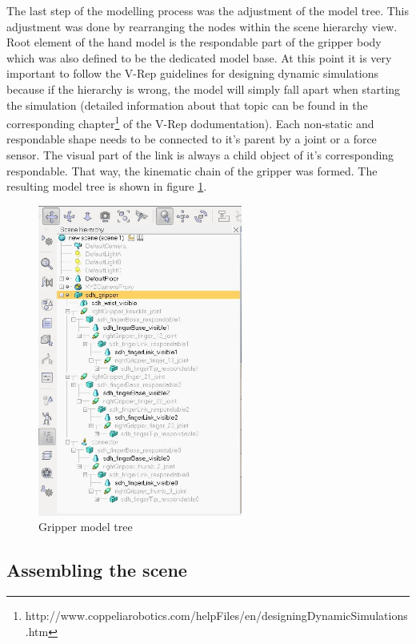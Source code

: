 The last step of the modelling process was the adjustment of the model tree. This adjustment was done by rearranging the nodes within the scene hierarchy view. Root element of the hand model is the respondable part of the gripper body which was also defined to be the dedicated model base. At this point it is very important to follow the V-Rep guidelines for designing dynamic simulations because if the hierarchy is wrong, the model will simply fall apart when starting the simulation (detailed information about that topic can be found in the corresponding chapter\footnote{http://www.coppeliarobotics.com/helpFiles/en/designingDynamicSimulations.htm} of the V-Rep dodumentation). Each non-static and respondable shape needs to be connected to it's parent by a joint or a force sensor. The visual part of the link is always a child object of it's corresponding respondable. That way, the kinematic chain of the gripper was formed. The resulting model tree is shown in figure \ref{fig:gripper_tree}.
\begin{figure}[ht]
	\centering
  	\includegraphics[width=0.6\textwidth]{images/gripper_tree.jpg}
	\caption{Gripper model tree}
	\label{fig:gripper_tree}
\end{figure}

\subsection{Assembling the scene}

